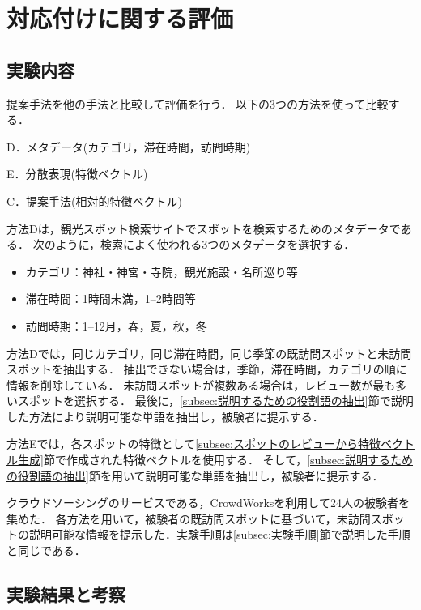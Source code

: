 \documentclass{deimj}
\begin{document}
\section{対応付けに関する評価}
\label{sec:対応付けに関する評価}
\subsection{実験内容}
提案手法を他の手法と比較して評価を行う．
以下の3つの方法を使って比較する．
\begin{description}
  \item D．メタデータ(カテゴリ，滞在時間，訪問時期)
  \item E．分散表現(特徴ベクトル)
  \item C．提案手法(相対的特徴ベクトル)
\end{description}

方法Dは，観光スポット検索サイトでスポットを検索するためのメタデータである．
次のように，検索によく使われる3つのメタデータを選択する．
\begin{itemize}
 \item カテゴリ：神社・神宮・寺院，観光施設・名所巡り等
 \item 滞在時間：1時間未満，1--2時間等
 \item 訪問時期：1--12月，春，夏，秋，冬
\end{itemize}

方法Dでは，同じカテゴリ，同じ滞在時間，同じ季節の既訪問スポットと未訪問スポットを抽出する．
抽出できない場合は，季節，滞在時間，カテゴリの順に情報を削除している．
未訪問スポットが複数ある場合は，レビュー数が最も多いスポットを選択する．
最後に，\ref{subsec:説明するための役割語の抽出}節で説明した方法により説明可能な単語を抽出し，被験者に提示する．

方法Eでは，各スポットの特徴として\ref{subsec:スポットのレビューから特徴ベクトル生成}節で作成された特徴ベクトルを使用する．
そして，\ref{subsec:説明するための役割語の抽出}節を用いて説明可能な単語を抽出し，被験者に提示する．

クラウドソーシングのサービスである，CrowdWorksを利用して24人の被験者を集めた．
各方法を用いて，被験者の既訪問スポットに基づいて，未訪問スポットの説明可能な情報を提示した．実験手順は\ref{subsec:実験手順}節で説明した手順と同じである．

\subsection{実験結果と考察}
\end{document}
